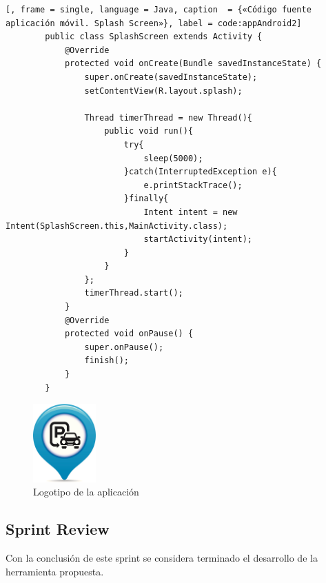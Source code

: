 	\begin{lstlisting}[, frame = single, language = Java, caption  = {«Código fuente aplicación móvil. Splash Screen»}, label = code:appAndroid2]
		public class SplashScreen extends Activity {
		    @Override
		    protected void onCreate(Bundle savedInstanceState) {
		        super.onCreate(savedInstanceState);
		        setContentView(R.layout.splash);
		
		        Thread timerThread = new Thread(){
		            public void run(){
		                try{
		                    sleep(5000);
		                }catch(InterruptedException e){
		                    e.printStackTrace();
		                }finally{
		                    Intent intent = new Intent(SplashScreen.this,MainActivity.class);
		                    startActivity(intent);
		                }
		            }
		        };
		        timerThread.start();
		    }
		    @Override
		    protected void onPause() {
		        super.onPause();
		        finish();
		    }
		}
	\end{lstlisting}
	
	\begin{figure}[H]
		\centering
		\includegraphics[height=3cm, fbox={\fboxrule} 4mm]{images/05-resultados/26-app_Android2.jpg}
		\caption{Logotipo de la aplicación}
		\label{fig:app-Android2}
	\end{figure}
			
	\subsection{Sprint Review}
Con la conclusión de este sprint se considera terminado el desarrollo de la herramienta propuesta.
	
